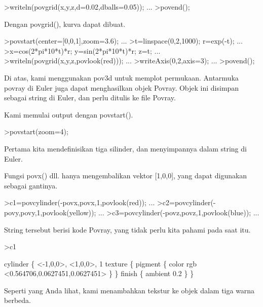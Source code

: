\documentclass{article}
\begin{document}
\begin{eulernotebook}
\begin{eulerprompt}
>writeln(povgrid(x,y,z,d=0.02,dballs=0.05)); ...
>povend();
\end{eulerprompt}
\begin{eulercomment}
Dengan povgrid(), kurva dapat dibuat.
\end{eulercomment}
\begin{eulerprompt}
>povstart(center=[0,0,1],zoom=3.6); ...
>t=linspace(0,2,1000); r=exp(-t); ...
>x=cos(2*pi*10*t)*r; y=sin(2*pi*10*t)*r; z=t; ...
>writeln(povgrid(x,y,z,povlook(red))); ...
>writeAxis(0,2,axis=3); ...
>povend();
\end{eulerprompt}
\begin{eulercomment}
Di atas, kami menggunakan pov3d untuk memplot permukaan. Antarmuka
povray di Euler juga dapat menghasilkan objek Povray. Objek ini
disimpan sebagai string di Euler, dan perlu ditulis ke file Povray.

Kami memulai output dengan povstart().
\end{eulercomment}
\begin{eulerprompt}
>povstart(zoom=4);
\end{eulerprompt}
\begin{eulercomment}
Pertama kita mendefinisikan tiga silinder, dan menyimpannya dalam
string di Euler.

Fungsi povx() dll. hanya mengembalikan vektor [1,0,0], yang dapat
digunakan sebagai gantinya.
\end{eulercomment}
\begin{eulerprompt}
>c1=povcylinder(-povx,povx,1,povlook(red)); ...
>c2=povcylinder(-povy,povy,1,povlook(yellow)); ...
>c3=povcylinder(-povz,povz,1,povlook(blue)); ...
\end{eulerprompt}
\begin{eulercomment}
String tersebut berisi kode Povray, yang tidak perlu kita pahami pada
saat itu.
\end{eulercomment}
\begin{eulerprompt}
>c1
\end{eulerprompt}
\begin{euleroutput}
  cylinder \{ <-1,0,0>, <1,0,0>, 1
   texture \{ pigment \{ color rgb <0.564706,0.0627451,0.0627451> \}  \} 
   finish \{ ambient 0.2 \} 
   \}
\end{euleroutput}
\begin{eulercomment}
Seperti yang Anda lihat, kami menambahkan tekstur ke objek dalam tiga
warna berbeda.


\end{eulercomment}
\end{eulernotebook}
\end{document}
